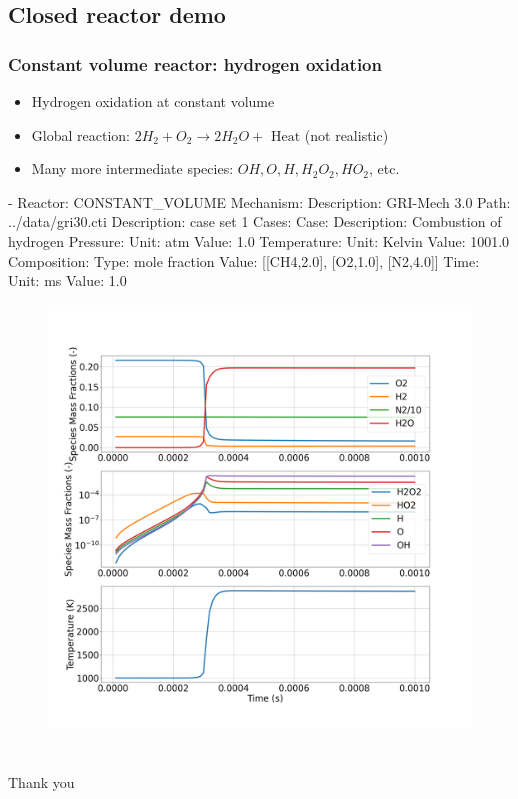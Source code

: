 \documentclass{beamer}
\begin{document}
\subsection{Closed reactor demo}
\begin{frame}[fragile]\frametitle{Constant volume reactor: hydrogen oxidation}
\begin{tiny}
  \begin{itemize}
    \item Hydrogen oxidation at constant volume
    \item Global reaction: $2H_2 + O_2 \rightarrow 2H_2O + \text{ Heat}$ (not realistic)
    \item Many more intermediate species: $OH, O, H, H_2O_2, HO_2$, etc.
  \end{itemize}
\end{tiny}
\begin{minipage}{.3\textwidth}
\begin{verbnobox}[\fontsize{4pt}{4pt}\selectfont]
- Reactor: CONSTANT_VOLUME
  Mechanism:
    Description: GRI-Mech 3.0
    Path: ../data/gri30.cti
  Description: case set 1
  Cases:
    Case:
      Description: Combustion of hydrogen
      Pressure:
        Unit:  atm
        Value: 1.0
      Temperature:
        Unit:  Kelvin
        Value: 1001.0
      Composition:
        Type:  mole fraction
        Value: [[CH4,2.0], [O2,1.0], [N2,4.0]]
      Time:
        Unit:  ms
        Value: 1.0
\end{verbnobox}
\end{minipage}
\hspace{0.1cm}
\begin{minipage}{.55\textwidth}
\begin{figure}
  \centering
  \includegraphics[width=0.99\linewidth]{figures/results/results.png}
\end{figure}
\end{minipage}
\end{frame}

\section*{}
\begin{frame}
\begin{center}
 \Huge Thank you
\end{center}
\end{frame}
\end{document}

